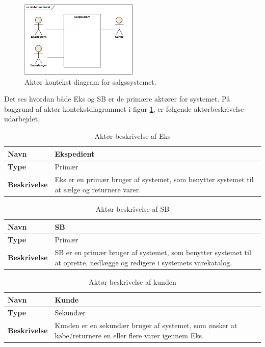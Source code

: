 \begin{figure}[htb]
    \centering
    \includegraphics[width=0.5\textwidth]{Kravspecifikation/Billeder/Aktorcont.PNG}
    \caption{Aktør kontekst diagram for salgssystemet.}
    \label{fig:aktcont}
\end{figure}

Det ses hvordan både \gls{Eks} og \gls{SB} er de primære aktører for systemet.
På baggrund af aktør kontekstdiagrammet i figur \ref{fig:aktcont}, er følgende aktørbeskrivelse udarbejdet.


\begin{table}[H]
    \begin{tabularx}{\textwidth}{|l|X|}
\hline
	\textbf{Navn} & Ekspedient \\
\hline
 	\textbf{Type} & Primær \\
\hline
	\textbf{Beskrivelse} & \gls{Eks} er en primær bruger af systemet, som benytter systemet til at sælge og returnere varer. \\
\hline
\end{tabularx}
\captionsetup{justification=raggedright,singlelinecheck=false}
\caption{Aktør beskrivelse af \gls{Eks}}
\label{tab:AktEks}
\end{table}

\begin{table}[H]
    \begin{tabularx}{\textwidth}{|l|X|}
\hline
	\textbf{Navn} & \gls{SB} \\
\hline
 	\textbf{Type} & Primær \\
\hline
	\textbf{Beskrivelse} & \gls{SB} er en primær bruger af systemet, som benytter systemet til at oprette, nedlægge og redigere i systemets varekatalog. \\
\hline
\end{tabularx}
\captionsetup{justification=raggedright,singlelinecheck=false}
\caption{Aktør beskrivelse af \gls{SB}}
\label{tab:AktSuu}
\end{table}

\begin{table}[H]
    \begin{tabularx}{\textwidth}{|l|X|}
\hline
	\textbf{Navn} & Kunde \\
\hline
 	\textbf{Type} & Sekundær \\
\hline
	\textbf{Beskrivelse} & Kunden er en sekundær bruger af systemet, som ønsker at købe/returnere en eller flere varer igennem \gls{Eks}.   \\
\hline
\end{tabularx}
\captionsetup{justification=raggedright,singlelinecheck=false}
\caption{Aktør beskrivelse af kunden}
\label{tab:AktKu}
\end{table}


\newpage

